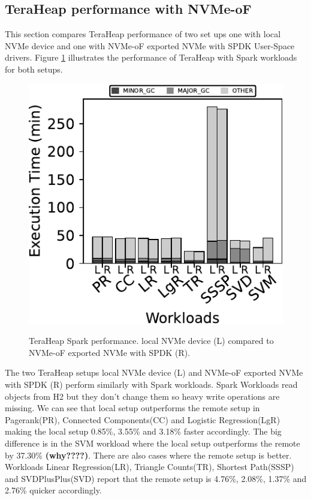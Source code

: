 {\subsection{TeraHeap performance with NVMe-oF}
\par This section compares TeraHeap performance of two set ups one with local NVMe device and one with NVMe-oF exported NVMe with SPDK User-Space drivers. Figure \ref{fig:bench_spark} illustrates the performance of TeraHeap with Spark workloads for both setups.
\begin{figure}[H]
  \includegraphics[width=\linewidth]{figures/bench_spark.pdf}\\
\caption{TeraHeap Spark performance. local NVMe device (L) compared to NVMe-oF exported NVMe with SPDK (R).}
\label{fig:bench_spark}
\end{figure}
The two TeraHeap setups local NVMe device (L) and NVMe-oF exported NVMe with SPDK (R) perform similarly with Spark workloads. Spark Workloads read objects from H2 but they don't change them so heavy write operations are missing. We can see that local setup outperforms the remote setup in Pagerank(PR), Connected Components(CC) and Logistic Regression(LgR) making the local setup 0.85\%, 3.55\% and 3.18\% faster accordingly. The big difference is in the SVM workload where the local setup outperforms the remote by 37.30\% \textbf{(why????)}. There are also cases where the remote setup is better. Workloads Linear Regression(LR), Triangle Counts(TR), Shortest Path(SSSP) and SVDPlusPlus(SVD) report that the remote setup is 4.76\%, 2.08\%, 1.37\% and 2.76\% quicker accordingly.
}
